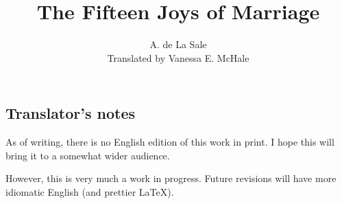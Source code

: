 \documentclass{book}
\begin{document}
\title{The Fifteen Joys of Marriage}
\author{A. de La Sale\\
Translated by Vanessa E. McHale}
\date{}
\maketitle
\tableofcontents

\subsection*{Translator's notes}
As of writing, there is no English edition of this work in print. I hope this will bring it to a somewhat wider audience. 

However, this is very much a work in progress. Future revisions will have more idiomatic English (and prettier \LaTeX). 
\end{document}
